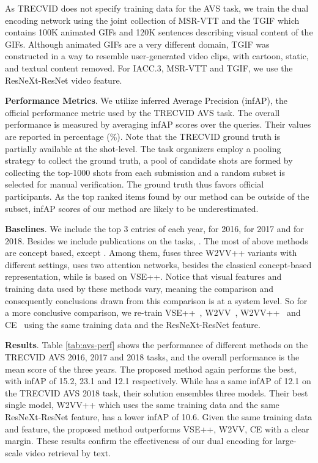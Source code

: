 As TRECVID does not specify training data for the AVS task, we train the dual encoding network using the joint collection of MSR-VTT and the TGIF \cite{tgif} which contains 100K animated GIFs and 120K sentences describing visual content of the GIFs. Although animated GIFs are a very different domain, TGIF was constructed in a way to resemble user-generated video clips, \eg with cartoon, static, and textual content removed. For IACC.3, MSR-VTT and TGIF, we use the ResNeXt-ResNet video feature.


\textbf{Performance Metrics}. 
We utilize inferred Average Precision (infAP), the official performance metric used by the TRECVID AVS task. The overall performance is measured by averaging infAP scores over the queries. Their values are reported in percentage (\%).
Note that the TRECVID ground truth is partially available at the shot-level. The task organizers employ a pooling strategy to collect the ground truth, \ie a pool of candidate shots are formed by collecting the top-1000 shots from each submission and a random subset is selected for manual verification. The ground truth thus favors official participants.
As the top ranked items found by our method can be outside of the subset, infAP scores of our method are likely to be underestimated.



\textbf{Baselines}.
We include the top 3 entries of each year, \ie \cite{tv16-nii,tv16-certh,tv16-inf} for 2016, \cite{tv17-uva,tv17-waseda,tv17-vireo} for 2017 and \cite{li2018renmin,tv18-informedia,tv18-ntu} for 2018. Besides we include publications on the tasks, \ie \cite{pami2017-videostory,icmr2017-certh-avs}. 
The most of above methods are concept based, except \cite{li2018renmin,tv18-informedia,tv18-ntu}. 
Among them, \cite{li2018renmin} fuses three W2VV++ variants with different settings, 
\cite{tv18-informedia} uses two attention networks, besides the classical concept-based representation, while \cite{tv18-ntu} is based on VSE++.
Notice that visual features and training data used by these methods vary, meaning the comparison and consequently conclusions drawn from this comparison is at a system level. So for a more conclusive comparison, we re-train VSE++~\cite{faghri2017vse}, W2VV~\cite{dong2018predicting}, W2VV++~\cite{li2019w2vv++} and CE~\cite{liu2019use} using the same training data and the ResNeXt-ResNet feature.

\textbf{Results}.
Table \ref{tab:avs-perf} shows the performance of different methods on the TRECVID AVS 2016, 2017 and 2018 tasks, and the overall performance is the mean score of the three years. The proposed method again performs the best, with infAP of 15.2, 23.1 and 12.1 respectively. While \cite{li2018renmin} has a same infAP of 12.1 on the TRECVID AVS 2018 task, their solution ensembles three models. Their best single model, \ie W2VV++ \cite{li2019w2vv++}  which uses the same training data and the same ResNeXt-ResNet feature, has a lower infAP of 10.6. 
Given the same training data and feature, the proposed method outperforms VSE++, W2VV, CE with a clear margin. 
These results confirm the effectiveness of our dual encoding for large-scale video retrieval by text.



